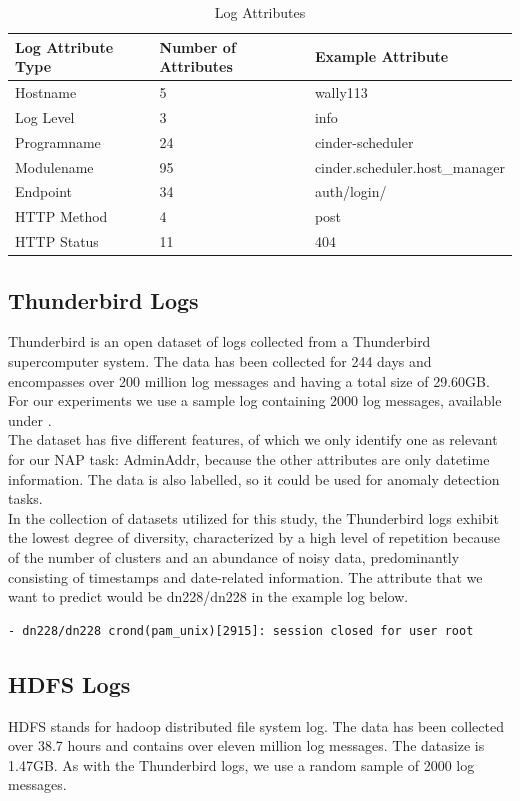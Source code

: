 \begin{table}[h]
    \centering
\begin{tabular}{l|ll}
\hline Log Attribute Type & Number of Attributes & Example Attribute \\
\hline Hostname & 5 & wally113 \\
Log Level & 3 & info \\
Programname & 24 & cinder-scheduler \\
Modulename & 95 & cinder.scheduler.host\_manager \\
Endpoint & 34 & auth/login/ \\
HTTP Method & 4 & post \\
HTTP Status & 11 & 404 \\
\hline
\end{tabular}
    \caption{Log Attributes}
    \label{tab:logAttributes}
\end{table}



\subsection{Thunderbird Logs}
\label{sec:Methods:Datasets:Thunderbird}
Thunderbird is an open dataset of logs collected from a Thunderbird supercomputer system. The data has been collected for 244 days and encompasses over 200 million log messages and having a total size of 29.60GB. For our experiments we use a sample log containing 2000 log messages, available under \cite{thunderbirdSampleLogs}. \\

The dataset has five different features, of which we only identify one as relevant for our NAP task: AdminAddr, because the other attributes are only datetime information. The data is also labelled, so it could be used for anomaly detection tasks.\\

In the collection of datasets utilized for this study, the Thunderbird logs exhibit the lowest degree of diversity, characterized by a high level of repetition because of the number of clusters and an abundance of noisy data, predominantly consisting of timestamps and date-related information. The attribute that we want to predict would be dn228/dn228 in the example log below.
\begin{verbatim}
- dn228/dn228 crond(pam_unix)[2915]: session closed for user root
\end{verbatim}

\subsection{HDFS Logs}
\label{sec:Methods:Datasets:HDFS}
HDFS stands for hadoop distributed file system log. The data has been collected over 38.7 hours and contains over eleven million log messages. The datasize is 1.47GB. As with the Thunderbird logs, we use a random sample of 2000 log messages.\\

